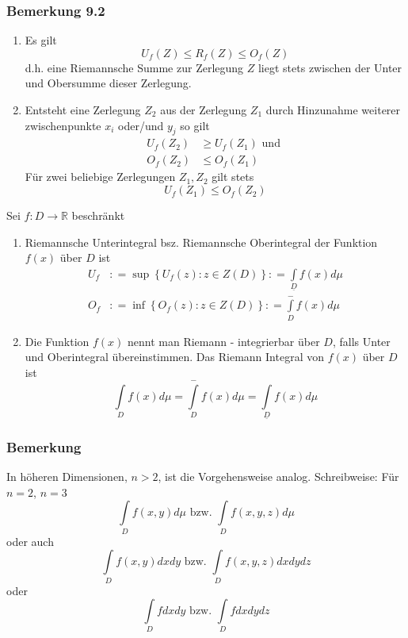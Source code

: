 \subsubsection*{Bemerkung 9.2}
\begin{enumerate}
\item Es gilt \[U_f\left( Z\right)\leq R_f\left( Z\right)\leq O_f\left( Z\right)\] d.h. eine Riemannsche Summe zur Zerlegung $Z$ liegt stets zwischen der Unter und Obersumme dieser Zerlegung. 
\item Entsteht eine Zerlegung $Z_2$ aus der Zerlegung $Z_1$ durch Hinzunahme weiterer zwischenpunkte $x_i$ oder/und $y_j$ so gilt 
\begin{align*}
U_f\left( Z_2\right)&\geq U_f\left( Z_1\right)\text{ und }\\
O_f\left( Z_2\right)&\leq O_f\left( Z_1\right)
\end{align*}
Für zwei beliebige Zerlegungen $Z_1,Z_2$ gilt stets \[U_f\left( Z_1\right)\leq O_f\left( Z_2\right)\]
\end{enumerate}
\begin{definition}{9.3}
Sei $f:D\to\mathbb{R}$ beschränkt 
\begin{enumerate}
\item Riemannsche Unterintegral bsz. Riemannsche Oberintegral der Funktion $f\left( x\right)$ über $D$ ist 
\begin{align*}
{U_f}&: = \sup \left\{ {{U_f}\left( z \right):z \in Z\left( D \right)} \right\}: = \int\limits_{\underline{D}} {f(x)d\mu } \\
{O_f}&: = \inf \left\{ {{O_f}\left( z \right):z \in Z\left( D \right)} \right\}: = \int\limits_D^ -  {f(x)d\mu } 
\end{align*}
\item Die Funktion $f(x)$ nennt man Riemann - integrierbar über $D$, falls Unter und Oberintegral übereinstimmen. Das Riemann Integral von $f(x)$ über $D$ ist \[\int\limits_D {f(x)d\mu  = \int\limits_D^ -  {f(x)d\mu  = } \int\limits_{\underline{D}} {f(x)d\mu } } \]
\end{enumerate}
\end{definition}

\subsubsection*{Bemerkung}
In höheren Dimensionen, $n >2$, ist die Vorgehensweise analog. Schreibweise: Für $n=2$, $n=3$
\[\int\limits_D {f\left( {x,y} \right)d\mu {\text{ bzw. }}} \int\limits_D {f\left( {x,y,z} \right)d\mu } \]
oder auch 
\[\int\limits_D {f\left( {x,y} \right)dxdy{\text{ bzw. }}} \int\limits_D {f\left( {x,y,z} \right)dxdydz} \]
oder 
\[\int\limits_D {fdxdy{\text{ bzw. }}} \int\limits_D {fdxdydz} \]

